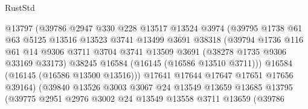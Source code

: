 \begin{lexlean}{RustStd}
\begin{coremodule}
                                @13797
                                (@39786
                                  @2947
                                  @330
                                  @228
                                  @13517
                                  @13524
                                  @3974
                                  (@39795
                                    @1738
                                    @61
                                    @63
                                    @5125
                                    @13516
                                    @13523
                                    @3741
                                    @13499
                                    @3691
                                    @38318
                                    (@39794
                                      @1736
                                      @116
                                      @61
                                      @14
                                      @9306
                                      @3711
                                      @3704
                                      @3741
                                      @13509
                                      @3691
                                      (@38278 @1735 @9306 @33169 @33173)
                                      @38245
                                      @16584
                                      (@16145 (@16586 @13510 @3711)))
                                    @16584
                                    (@16145 (@16586 @13500 @13516)))
                                  @17641
                                  @17644
                                  @17647
                                  @17651
                                  @17656
                                  @39164)
                                (@39840
                                  @13526
                                  @3003
                                  @3067
                                  @24
                                  @13549
                                  @13659
                                  @13685
                                  @13795
                                  (@39775
                                    @2951
                                    @2976
                                    @3002
                                    @24
                                    @13549
                                    @13558
                                    @3711
                                    @13659
                                    (@39786

\end{coremodule}
\end{lexlean}
